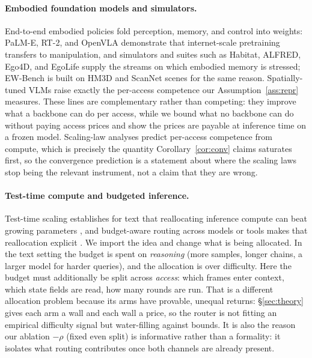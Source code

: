 \documentclass[10pt]{article}
\theoremstyle{definition}
\theoremstyle{plain}
\begin{document}
\paragraph{Embodied foundation models and simulators.}
End-to-end embodied policies fold perception, memory, and control into weights: PaLM-E, RT-2, and OpenVLA \citep{palme,rt2,openvla} demonstrate that internet-scale pretraining transfers to manipulation, and simulators and suites such as Habitat, ALFRED, Ego4D, and EgoLife \citep{habitat,alfred,ego4d,egolife} supply the streams on which embodied memory is stressed; EW-Bench is built on HM3D and ScanNet scenes \citep{hm3d,scannet} for the same reason. Spatially-tuned VLMs \citep{spatialvlm} raise exactly the per-access competence our Assumption~\ref{ass:repr} measures. These lines are complementary rather than competing: they improve what a backbone can do per access, while we bound what no backbone can do without paying access prices and show the prices are payable at inference time on a frozen model. Scaling-law analyses \citep{kaplan,chinchilla} predict per-access competence from compute, which is precisely the quantity Corollary~\ref{cor:conv} claims saturates first, so the convergence prediction is a statement about where the scaling laws stop being the relevant instrument, not a claim that they are wrong.

\paragraph{Test-time compute and budgeted inference.}
Test-time scaling establishes for text that reallocating inference compute can beat growing parameters \citep{snell,s1}, and budget-aware routing across models or tools makes that reallocation explicit \citep{routellm,frugalgpt}. We import the idea and change what is being allocated. In the text setting the budget is spent on \emph{reasoning} (more samples, longer chains, a larger model for harder queries), and the allocation is over difficulty. Here the budget must additionally be split across \emph{access}: which frames enter context, which state fields are read, how many rounds are run. That is a different allocation problem because its arms have provable, unequal returns: \S\ref{sec:theory} gives each arm a wall and each wall a price, so the router is not fitting an empirical difficulty signal but water-filling against bounds. It is also the reason our ablation $-\rho$ (fixed even split) is informative rather than a formality: it isolates what routing contributes once both channels are already present.
\end{document}
